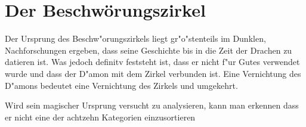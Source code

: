 \chapter{Der Beschwörungszirkel}

\par Der Ursprung des Beschw"orungszirkels liegt gr"o"stenteils im Dunklen, Nachforschungen ergeben, dass seine Geschichte bis in die Zeit der Drachen zu datieren ist. Was jedoch definitv feststeht ist, dass er nicht f"ur Gutes verwendet wurde und dass der D"amon mit dem Zirkel verbunden ist. Eine Vernichtung des D"amons bedeutet eine Vernichtung des Zirkels und umgekehrt.

\par Wird sein magischer Ursprung versucht zu analysieren, kann man erkennen dass er nicht eine der achtzehn Kategorien einzusortieren
